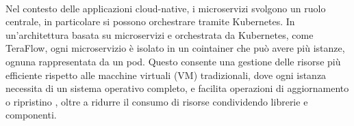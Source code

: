 \\Nel contesto delle applicazioni cloud-native, i microservizi svolgono un ruolo centrale, in particolare si possono orchestrare tramite Kubernetes.
In un'architettura basata su microservizi e orchestrata da Kubernetes, come TeraFlow,  %
ogni microservizio è isolato in un cointainer che può avere più istanze, ognuna rappresentata da un pod.
Questo consente una gestione delle risorse più efficiente rispetto alle macchine virtuali (VM) tradizionali,
dove ogni istanza necessita di un sistema operativo completo,
e facilita operazioni di aggiornamento o ripristino \cite{artkub}, 
oltre a ridurre il consumo di risorse
condividendo librerie e componenti.


